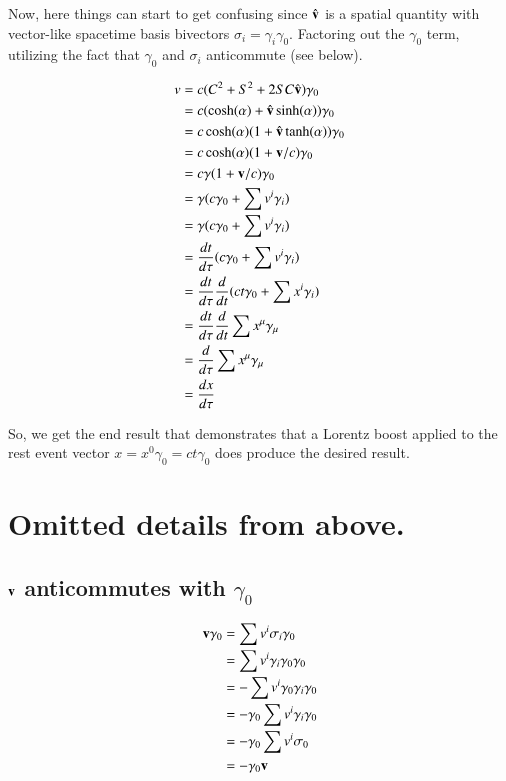\documentclass{article}      %
\begin{document}
Now, here things can start to get confusing since $\hat{\mathbf{v}}$ is a spatial quantity with vector-like spacetime basis bivectors $\sigma_i = \gamma_i \gamma_0$.  Factoring out the $\gamma_0$ term, utilizing the fact that $\gamma_0$ and $\sigma_i$ anticommute (see below).

\begin{align*}
v
&= c ( C^2 + S^2 + 2 SC \vcap ) \gamma_0 \\
&= c ( \cosh(\alpha) + \vcap \sinh(\alpha) ) \gamma_0 \\
&= c \cosh(\alpha) ( 1 + \vcap \tanh(\alpha) ) \gamma_0 \\
&= c \cosh(\alpha) ( 1 + \Bv/c ) \gamma_0 \\
&= c \gamma ( 1 + \Bv/c ) \gamma_0 \\
&= \gamma ( c \gamma_0 + \sum v^i \gamma_i ) \\
%
%
&= \gamma ( c \gamma_0 + \sum v^i \gamma_i) \\
&= \frac{dt}{d\tau}( c \gamma_0 + \sum v^i \gamma_i) \\
&= \frac{dt}{d\tau} \frac{d}{dt}( c t \gamma_0 + \sum x^i \gamma_i) \\
&= \frac{dt}{d\tau} \frac{d}{dt} \sum x^{\mu} \gamma_{\mu} \\
&= \frac{d}{d\tau} \sum x^{\mu} \gamma_{\mu} \\
&= \frac{dx}{d\tau}
\end{align*}

So, we get the end result that demonstrates that a Lorentz boost applied to the rest event vector $x = x^0 \gamma_0 = c t \gamma_0$ does produce the desired result.

\section{ Omitted details from above. }

\subsection{ $\mathbf{v}$ anticommutes with $\gamma_0$ }

\begin{align*}
\mathbf{v} \gamma_0 
&= \sum v^i \sigma_i \gamma_0 \\
&= \sum v^i \gamma_i \gamma_0 \gamma_0 \\
&= -\sum v^i \gamma_0 \gamma_i \gamma_0 \\
&= - \gamma_0 \sum v^i \gamma_i \gamma_0 \\
&= - \gamma_0 \sum v^i \sigma_0 \\
&= - \gamma_0 \mathbf{v}
\end{align*}
\end{document}
